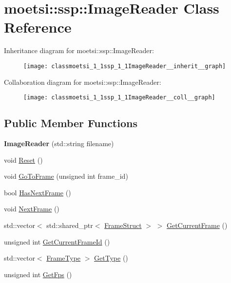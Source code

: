 \hypertarget{classmoetsi_1_1ssp_1_1ImageReader}{}\section{moetsi\+:\+:ssp\+:\+:Image\+Reader Class Reference}
\label{classmoetsi_1_1ssp_1_1ImageReader}


Inheritance diagram for moetsi\+:\+:ssp\+:\+:Image\+Reader\+:
\nopagebreak
\begin{figure}[H]
\begin{center}
\leavevmode
\texttt{[image: classmoetsi\_1\_1ssp\_1\_1ImageReader\_\_inherit\_\_graph]}
\end{center}
\end{figure}


Collaboration diagram for moetsi\+:\+:ssp\+:\+:Image\+Reader\+:
\nopagebreak
\begin{figure}[H]
\begin{center}
\leavevmode
\texttt{[image: classmoetsi\_1\_1ssp\_1\_1ImageReader\_\_coll\_\_graph]}
\end{center}
\end{figure}
\subsection*{Public Member Functions}
\begin{DoxyCompactItemize}
\item 
\mbox{\label{classmoetsi_1_1ssp_1_1ImageReader_a8b64ab50c05bcf2179a7921fdb9baa29}} 
{\bfseries Image\+Reader} (std\+::string filename)
\item 
void \hyperlink{classmoetsi_1_1ssp_1_1ImageReader_ae9ffc89ceed365c96b8d50e46ee8dc20}{Reset} ()
\item 
void \hyperlink{classmoetsi_1_1ssp_1_1ImageReader_a32eb88cc612e6920f4910e0803b0ce3c}{Go\+To\+Frame} (unsigned int frame\+\_\+id)
\item 
bool \hyperlink{classmoetsi_1_1ssp_1_1ImageReader_ad8e87720ca0ec97de501f1070119b28d}{Has\+Next\+Frame} ()
\item 
void \hyperlink{classmoetsi_1_1ssp_1_1ImageReader_a9b0a43f9a4fff4d0b8448e8ba168ad05}{Next\+Frame} ()
\item 
std\+::vector$<$ std\+::shared\+\_\+ptr$<$ \hyperlink{structmoetsi_1_1ssp_1_1FrameStruct}{Frame\+Struct} $>$ $>$ \hyperlink{classmoetsi_1_1ssp_1_1ImageReader_aacdb29f83bf5e38231ef26d89338c3b1}{Get\+Current\+Frame} ()
\item 
unsigned int \hyperlink{classmoetsi_1_1ssp_1_1ImageReader_a386125736df9f25e5c4312bb679ff031}{Get\+Current\+Frame\+Id} ()
\item 
std\+::vector$<$ \hyperlink{namespacemoetsi_1_1ssp_a46efdfa2cd5a28ead465dcc8006b5a87}{Frame\+Type} $>$ \hyperlink{classmoetsi_1_1ssp_1_1ImageReader_af6f66957b6e3268c5336f4176c77fc73}{Get\+Type} ()
\item 
unsigned int \hyperlink{classmoetsi_1_1ssp_1_1ImageReader_a86adfec8106c366aaf1ec63e2a7da156}{Get\+Fps} ()
\end{DoxyCompactItemize}


